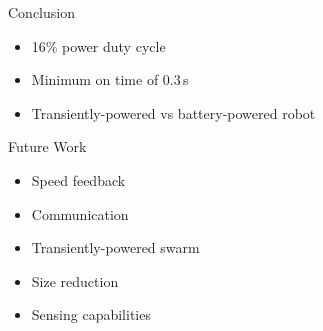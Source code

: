 \documentclass{beamer}
\begin{document}
\begin{frame}{Conclusion}
	\begin{itemize}
		\setlength\itemsep{1em}	
		\item 16\% power duty cycle
		\item Minimum on time of 0.3\,s
		\item Transiently-powered vs battery-powered robot
	\end{itemize}
\end{frame}

\begin{frame}{Future Work}
	\begin{itemize}
		\setlength\itemsep{1em}
		\item Speed feedback 
		\item Communication
		\item Transiently-powered swarm
		\item Size reduction
		\item Sensing capabilities
	\end{itemize}
\end{frame}
\end{document}
